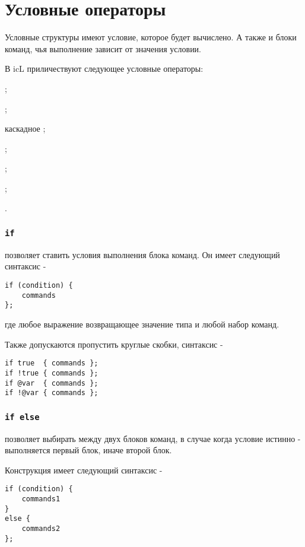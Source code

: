 \section{Условные операторы}

Условные структуры имеют условие, которое будет вычислено. А также и блоки команд, чья выполнение зависит от значения условии.

В icL приличествуют следующее условные операторы:
\begin{icItems}
	\item {};
	\item {};
	\item каскадное ;
	\item {};
	\item {};
	\item {};
	\item {}.
\end{icItems}

\subsubsection{\lstinline|if|}

 позволяет ставить условия выполнения блока команд. Он имеет следующий синтаксис -
\begin{lstlisting}[numbers=none]
if (condition) {
	commands
};
\end{lstlisting}
где  любое выражение возвращающее значение типа \bool{} и  любой набор команд.

Также допускаются пропустить круглые скобки, синтаксис -
\begin{lstlisting}[numbers=none]
if true  { commands };
if !true { commands };
if @var  { commands };
if !@var { commands };
\end{lstlisting}

\subsubsection{\lstinline|if else|}

 позволяет выбирать между двух блоков команд, в случае когда условие истинно - выполняется первый блок, иначе второй блок.

Конструкция  имеет следующий синтаксис -
\begin{lstlisting}[numbers=none]
if (condition) {
	commands1
}
else {
	commands2
};
\end{lstlisting}

